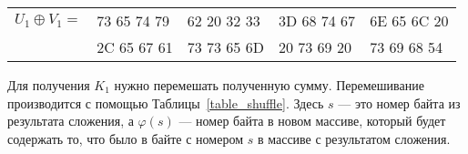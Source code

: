 \documentclass[10pt]{article}
\begin{document}
\begin{center}
  \begin{tabular}{lllll}
    $U_1 \oplus V_1 =$ & 73 65 74 79 & 62 20 32 33 & 3D 68 74 67 & 6E 65 6C 20 \\
                       & 2C 65 67 61 & 73 73 65 6D & 20 73 69 20 & 73 69 68 54 \\
  \end{tabular}
\end{center}

Для получения $K_1$ нужно перемешать полученную сумму. Перемешивание производится с помощью Таблицы~\ref{table_shuffle}. Здесь $s$ --- это номер байта из результата сложения, а $\varphi(s)$ --- номер байта в новом массиве, который будет содержать то, что было в байте с номером $s$ в массиве с результатом сложения.
\end{document}
